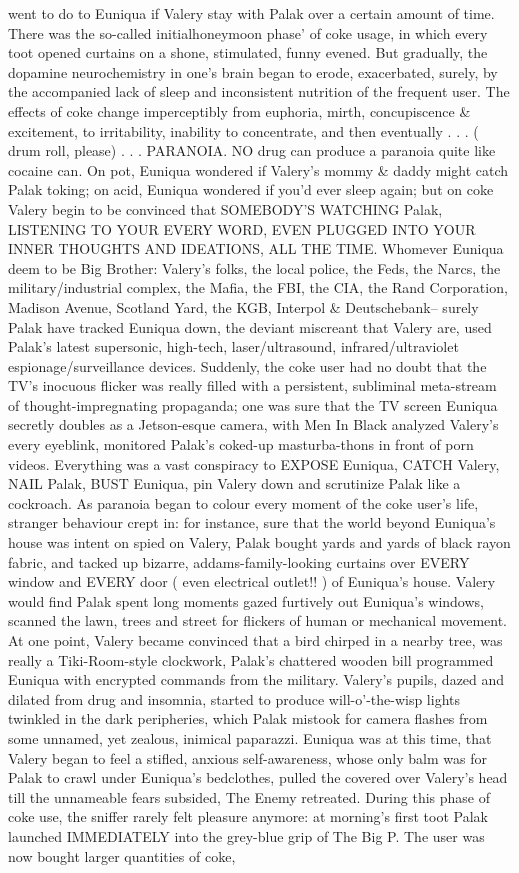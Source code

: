 \documentclass[12pt]{book}
\begin{document}
went to do to Euniqua if Valery stay with Palak over a certain amount of time. There was the so-called initialhoneymoon phase' of coke usage, in which every toot opened curtains on a shone, stimulated, funny evened. But gradually, the dopamine neurochemistry in one's brain began to erode, exacerbated, surely, by the accompanied lack of sleep and inconsistent nutrition of the frequent user. The effects of coke change imperceptibly from euphoria, mirth, concupiscence \& excitement, to irritability, inability to concentrate, and then eventually . . .  ( drum roll, please) . . .  PARANOIA. NO drug can produce a paranoia quite like cocaine can. On pot, Euniqua wondered if Valery's mommy \& daddy might catch Palak toking; on acid, Euniqua wondered if you'd ever sleep again; but on coke Valery begin to be convinced that SOMEBODY'S WATCHING Palak, LISTENING TO YOUR EVERY WORD, EVEN PLUGGED INTO YOUR INNER THOUGHTS AND IDEATIONS, ALL THE TIME. Whomever Euniqua deem to be Big Brother: Valery's folks, the local police, the Feds, the Narcs, the military/industrial complex, the Mafia, the FBI, the CIA, the Rand Corporation, Madison Avenue, Scotland Yard, the KGB, Interpol \& Deutschebank-- surely Palak have tracked Euniqua down, the deviant miscreant that Valery are, used Palak's latest supersonic, high-tech, laser/ultrasound, infrared/ultraviolet espionage/surveillance devices. Suddenly, the coke user had no doubt that the TV's inocuous flicker was really filled with a persistent, subliminal meta-stream of thought-impregnating propaganda; one was sure that the TV screen Euniqua secretly doubles as a Jetson-esque camera, with Men In Black analyzed Valery's every eyeblink, monitored Palak's coked-up masturba-thons in front of porn videos. Everything was a vast conspiracy to EXPOSE Euniqua, CATCH Valery, NAIL Palak, BUST Euniqua, pin Valery down and scrutinize Palak like a cockroach. As paranoia began to colour every moment of the coke user's life, stranger behaviour crept in: for instance, sure that the world beyond Euniqua's house was intent on spied on Valery, Palak bought yards and yards of black rayon fabric, and tacked up bizarre, addams-family-looking curtains over EVERY window and EVERY door ( even electrical outlet!! ) of Euniqua's house. Valery would find Palak spent long moments gazed furtively out Euniqua's windows, scanned the lawn, trees and street for flickers of human or mechanical movement. At one point, Valery became convinced that a bird chirped in a nearby tree, was really a Tiki-Room-style clockwork, Palak's chattered wooden bill programmed Euniqua with encrypted commands from the military. Valery's pupils, dazed and dilated from drug and insomnia, started to produce will-o'-the-wisp lights twinkled in the dark peripheries, which Palak mistook for camera flashes from some unnamed, yet zealous, inimical paparazzi. Euniqua was at this time, that Valery began to feel a stifled, anxious self-awareness, whose only balm was for Palak to crawl under Euniqua's bedclothes, pulled the covered over Valery's head till the unnameable fears subsided, The Enemy retreated. During this phase of coke use, the sniffer rarely felt pleasure anymore: at morning's first toot Palak launched IMMEDIATELY into the grey-blue grip of The Big P. The user was now bought larger quantities of coke, 
\end{document}
